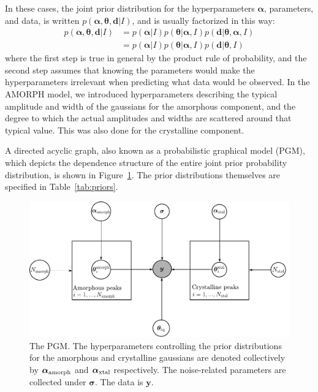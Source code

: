 \documentclass[review]{elsarticle}
\newcommand{\hypers}{\boldsymbol{\alpha}}
\newcommand{\params}{\boldsymbol{\theta}}
\newcommand{\data}{\boldsymbol{d}}
\newcommand{\info}{I}
\newcommand{\changed}{\color{blue}}
\begin{document}
{\changed In these cases,
the joint prior distribution for
the hyperparameters $\hypers$}, parameters, and data,
is written $p(\hypers, \params, \data | \info)$, and is usually factorized
in this way:
\begin{align}
p(\hypers, \params, \data | \info) &=
    p(\hypers | \info)p(\params | \hypers, \info)
    p(\data | \params, \hypers, \info)\\
    &= p(\hypers | \info)p(\params | \hypers, \info)
    p(\data | \params, \info)
\end{align}
where the first step is true in general by the product rule
{\changed of probability}, and the second
step assumes that knowing the parameters would make the hyperparameters
irrelevant when predicting what data would be observed. In the AMORPH model,
we introduced hyperparameters describing the typical amplitude
and width of the gaussians for the amorphous component, and
the degree to which the actual amplitudes and widths are scattered
around that typical value. This was also done for the crystalline
component.

A directed acyclic graph, also known as a probabilistic graphical model (PGM),
which depicts the dependence structure of the entire joint
prior probability distribution,
is shown in Figure~\ref{fig:pgm-edited}. The prior distributions themselves
are specified in Table~\ref{tab:priors}.

\begin{figure}[!ht]
\centering
\includegraphics[scale=0.7]{figures/pgm-edited.pdf}
\caption{The PGM. The hyperparameters controlling the prior distributions
for the amorphous and crystalline gaussians are denoted collectively
by $\boldsymbol{\alpha}_{\rm amorph}$ and
$\boldsymbol{\alpha}_{\rm xtal}$ respectively.
The noise-related parameters are collected under $\boldsymbol{\sigma}$.
The data is $\boldsymbol{y}$.\label{fig:pgm-edited}}
\end{figure}
\end{document}
